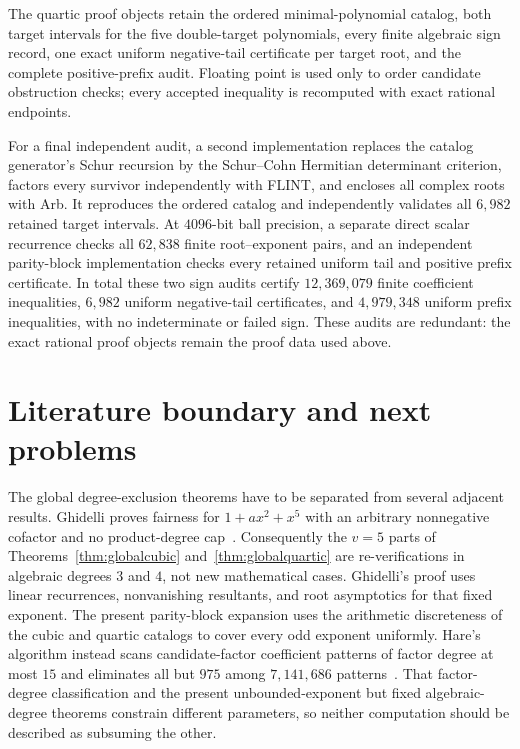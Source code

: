 \documentclass[11pt]{article}
\theoremstyle{remark}
\numberwithin{equation}{section}
\begin{document}
The quartic proof objects retain the ordered minimal-polynomial catalog, both
target intervals for the five double-target polynomials, every finite
algebraic sign record, one exact uniform negative-tail certificate per target
root, and the complete positive-prefix audit.  Floating point is used only to
order candidate obstruction checks; every accepted inequality is recomputed
with exact rational endpoints.

For a final independent audit, a second implementation replaces the catalog
generator's Schur recursion by the Schur--Cohn Hermitian determinant criterion,
factors every survivor independently with FLINT, and encloses all complex roots
with Arb.  It reproduces the ordered catalog and independently validates all
$6{,}982$ retained target intervals.  At $4096$-bit ball precision, a
separate direct scalar recurrence checks all $62{,}838$ finite root--exponent
pairs, and an independent
parity-block implementation checks every retained uniform tail and positive
prefix certificate.  In total these two sign audits certify $12{,}369{,}079$
finite coefficient inequalities, $6{,}982$ uniform negative-tail
certificates, and $4{,}979{,}348$ uniform prefix inequalities, with no
indeterminate or failed sign.  These audits are redundant: the exact
rational proof objects remain the proof data used above.

\section{Literature boundary and next problems}

The global degree-exclusion theorems have to be separated from several
adjacent results.
Ghidelli proves fairness for $1+a x^2+x^5$ with an arbitrary nonnegative
cofactor and no product-degree cap~\cite{Ghidelli}.  Consequently the $v=5$
parts of Theorems~\ref{thm:globalcubic} and~\ref{thm:globalquartic} are
re-verifications in algebraic degrees $3$ and $4$, not new mathematical cases.
Ghidelli's proof uses linear recurrences, nonvanishing resultants, and root
asymptotics for that fixed exponent.  The present parity-block expansion uses
the arithmetic discreteness of the cubic and quartic catalogs to cover every
odd exponent uniformly.  Hare's algorithm instead scans candidate-factor
coefficient patterns of factor degree at most $15$ and eliminates all but
$975$ among $7{,}141{,}686$ patterns~\cite{Hare}.  That factor-degree
classification and
the present unbounded-exponent but fixed algebraic-degree theorems constrain
different parameters, so neither computation should be described as subsuming
the other.
\end{document}
